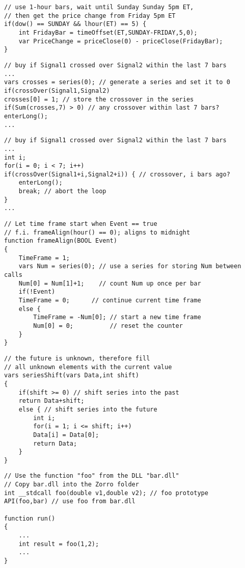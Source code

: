 \begin{lstlisting}[caption=Calculate the weekend price change for gap trading]
// use 1-hour bars, wait until Sunday Sunday 5pm ET, 
// then get the price change from Friday 5pm ET
if(dow() == SUNDAY && lhour(ET) == 5) { 
	int FridayBar = timeOffset(ET,SUNDAY-FRIDAY,5,0);
	var PriceChange = priceClose(0) - priceClose(FridayBar);
}
\end{lstlisting}


\begin{lstlisting}[caption=Use a series to check if something happened within the last n bars]
// buy if Signal1 crossed over Signal2 within the last 7 bars
...
vars crosses = series(0); // generate a series and set it to 0
if(crossOver(Signal1,Signal2)
crosses[0] = 1; // store the crossover in the series
if(Sum(crosses,7) > 0) // any crossover within last 7 bars?
enterLong();
...
\end{lstlisting}

\begin{lstlisting}[caption=Use a loop to check if something happened within the last n bars]
// buy if Signal1 crossed over Signal2 within the last 7 bars
...
int i;
for(i = 0; i < 7; i++)
if(crossOver(Signal1+i,Signal2+i)) { // crossover, i bars ago?
	enterLong();
	break; // abort the loop
}
...
\end{lstlisting}

\begin{lstlisting}[caption=Align a time frame to a certain event]
// Let time frame start when Event == true
// f.i. frameAlign(hour() == 0); aligns to midnight
function frameAlign(BOOL Event)
{
	TimeFrame = 1;
	vars Num = series(0); // use a series for storing Num between calls
	Num[0] = Num[1]+1;    // count Num up once per bar
	if(!Event) 
	TimeFrame = 0;      // continue current time frame
	else {
		TimeFrame = -Num[0]; // start a new time frame
		Num[0] = 0;          // reset the counter
	}
}
\end{lstlisting}


\begin{lstlisting}[caption=Shift a series into the future]
// the future is unknown, therefore fill 
// all unknown elements with the current value
vars seriesShift(vars Data,int shift)
{
	if(shift >= 0) // shift series into the past
	return Data+shift;
	else { // shift series into the future
		int i;
		for(i = 1; i <= shift; i++)
		Data[i] = Data[0];
		return Data;
	}
}
\end{lstlisting}

\begin{lstlisting}[caption=Use a function from an external DLL]
// Use the function "foo" from the DLL "bar.dll"
// Copy bar.dll into the Zorro folder
int __stdcall foo(double v1,double v2); // foo prototype
API(foo,bar) // use foo from bar.dll

function run()
{
	...
	int result = foo(1,2);
	...
}
\end{lstlisting}

